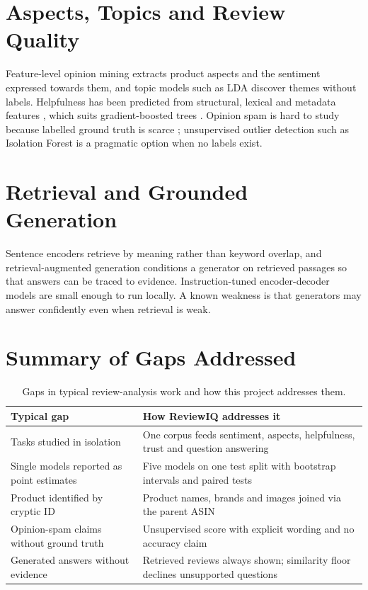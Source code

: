 \documentclass[12pt,a4paper]{report}
\begin{document}
\section{Aspects, Topics and Review Quality}
Feature-level opinion mining \cite{hu2004mining} extracts product aspects and the sentiment expressed towards them, and topic models such as LDA \cite{blei2003lda} discover themes without labels. Helpfulness has been predicted from structural, lexical and metadata features \cite{kim2006automatically}, which suits gradient-boosted trees \cite{chen2016xgboost}. Opinion spam is hard to study because labelled ground truth is scarce \cite{jindal2008opinion,ott2011finding}; unsupervised outlier detection such as Isolation Forest \cite{liu2008isolation} is a pragmatic option when no labels exist.

\section{Retrieval and Grounded Generation}
Sentence encoders \cite{reimers2019sbert,wang2020minilm} retrieve by meaning rather than keyword overlap, and retrieval-augmented generation \cite{lewis2020rag} conditions a generator on retrieved passages so that answers can be traced to evidence. Instruction-tuned encoder-decoder models \cite{raffel2020t5,chung2022flan} are small enough to run locally. A known weakness is that generators may answer confidently even when retrieval is weak.

\section{Summary of Gaps Addressed}
\begin{table}[htbp]
\centering
\caption{Gaps in typical review-analysis work and how this project addresses them.}
\small
\begin{tabularx}{\textwidth}{@{}>{\raggedright\arraybackslash}p{4.3cm}X@{}}
\toprule
Typical gap & How ReviewIQ addresses it \\
\midrule
Tasks studied in isolation & One corpus feeds sentiment, aspects, helpfulness, trust and question answering \\
Single models reported as point estimates & Five models on one test split with bootstrap intervals and paired tests \\
Product identified by cryptic ID & Product names, brands and images joined via the parent ASIN \\
Opinion-spam claims without ground truth & Unsupervised score with explicit wording and no accuracy claim \\
Generated answers without evidence & Retrieved reviews always shown; similarity floor declines unsupported questions \\
\bottomrule
\end{tabularx}
\end{table}
\end{document}
